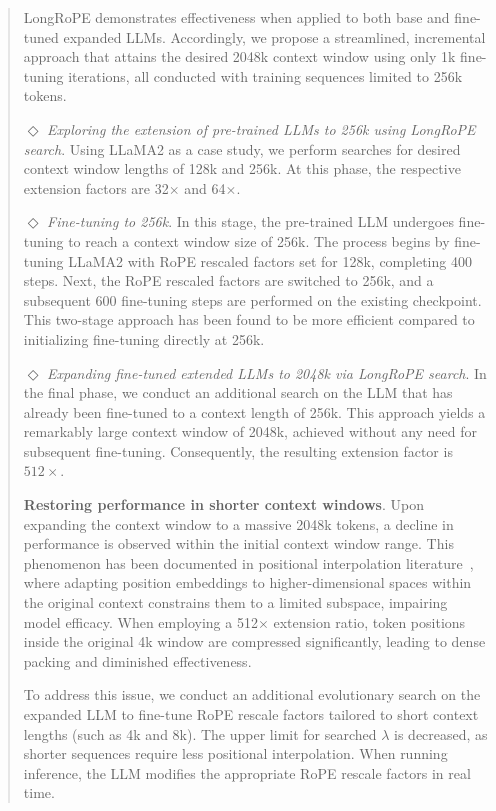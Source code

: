 \begin{abstract}
LongRoPE demonstrates effectiveness when applied to both base and fine-tuned expanded LLMs. Accordingly, we propose a streamlined, incremental approach that attains the desired 2048k context window using only 1k fine-tuning iterations, all conducted with training sequences limited to 256k tokens.

$\Diamond$ \textit{Exploring the extension of pre-trained LLMs to 256k using LongRoPE search}. Using LLaMA2 as a case study, we perform searches for desired context window lengths of 128k and 256k. At this phase, the respective extension factors are 32$\times$ and 64$\times$.

$\Diamond$ \textit{Fine-tuning to 256k}. In this stage, the pre-trained LLM undergoes fine-tuning to reach a context window size of 256k. The process begins by fine-tuning LLaMA2 with RoPE rescaled factors set for 128k, completing 400 steps. Next, the RoPE rescaled factors are switched to 256k, and a subsequent 600 fine-tuning steps are performed on the existing checkpoint. This two-stage approach has been found to be more efficient compared to initializing fine-tuning directly at 256k.

$\Diamond$ \textit{Expanding fine-tuned extended LLMs to 2048k via LongRoPE search}. In the final phase, we conduct an additional search on the LLM that has already been fine-tuned to a context length of 256k. This approach yields a remarkably large context window of 2048k, achieved without any need for subsequent fine-tuning. Consequently, the resulting extension factor is $512\times$.

\textbf{Restoring performance in shorter context windows}. Upon expanding the context window to a massive 2048k tokens, a decline in performance is observed within the initial context window range. This phenomenon has been documented in positional interpolation literature~\cite{pi}, where adapting position embeddings to higher-dimensional spaces within the original context constrains them to a limited subspace, impairing model efficacy. When employing a 512$\times$ extension ratio, token positions inside the original 4k window are compressed significantly, leading to dense packing and diminished effectiveness.

To address this issue, we conduct an additional evolutionary search on the expanded LLM to fine-tune RoPE rescale factors tailored to short context lengths (such as 4k and 8k). The upper limit for searched $\lambda$ is decreased, as shorter sequences require less positional interpolation. When running inference, the LLM modifies the appropriate RoPE rescale factors in real time.


\end{abstract}
